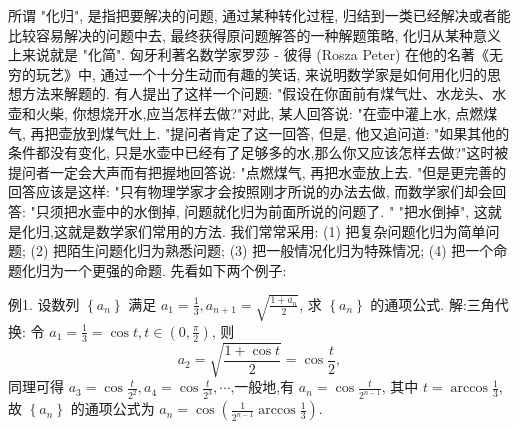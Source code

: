 
所谓 "化归", 是指把要解决的问题, 通过某种转化过程, 归结到一类已经解决或者能比较容易解决的问题中去, 最终获得原问题解答的一种解题策略, 化归从某种意义上来说就是 "化简". 匈牙利著名数学家罗莎 - 彼得 (Rosza Peter) 在他的名著《无穷的玩艺》中, 通过一个十分生动而有趣的笑话, 来说明数学家是如何用化归的思想方法来解题的.
有人提出了这样一个问题: "假设在你面前有煤气灶、水龙头、水壶和火柴, 你想烧开水,应当怎样去做?"对此, 某人回答说: "在壶中灌上水, 点燃煤气, 再把壶放到煤气灶上.
"提问者肯定了这一回答, 但是, 他又追问道: "如果其他的条件都没有变化, 只是水壶中已经有了足够多的水,那么你又应该怎样去做?"这时被提问者一定会大声而有把握地回答说: "点燃煤气, 再把水壶放上去.
"但是更完善的回答应该是这样: "只有物理学家才会按照刚才所说的办法去做, 而数学家们却会回答: "只须把水壸中的水倒掉, 问题就化归为前面所说的问题了.
" "把水倒掉", 这就是化归,这就是数学家们常用的方法.
我们常常采用: (1) 把复杂问题化归为简单问题; (2) 把陌生问题化归为熟悉问题; (3) 把一般情况化归为特殊情况; (4) 把一个命题化归为一个更强的命题.
先看如下两个例子:



例1. 设数列 $\left\{a_n\right\}$ 满足 $a_1=\frac{1}{3}, a_{n+1}=\sqrt{\frac{1+a_n}{2}}$, 求 $\left\{a_n\right\}$ 的通项公式.
解:三角代换: 令 $a_1=\frac{1}{3}=\cos t, t \in\left(0, \frac{\pi}{2}\right)$, 则
$$
a_2=\sqrt{\frac{1+\cos t}{2}}=\cos \frac{t}{2},
$$
同理可得 $a_3=\cos \frac{t}{2^2}, a_4=\cos \frac{t}{2^3}, \cdots$,一般地,有 $a_n=\cos \frac{t}{2^{n-1}}$, 其中 $t= \arccos \frac{1}{3}$, 故 $\left\{a_n\right\}$ 的通项公式为 $a_n=\cos \left(\frac{1}{2^{n-1}} \arccos \frac{1}{3}\right)$.



